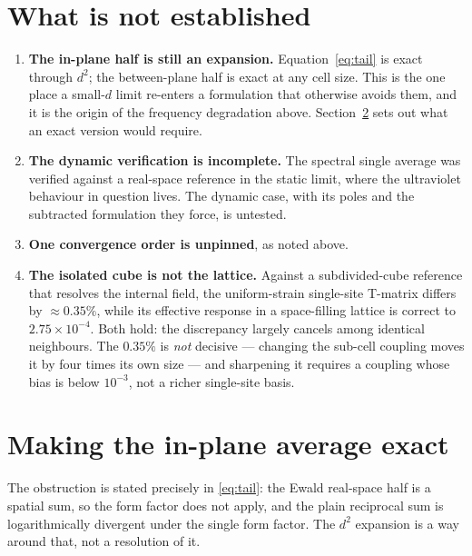 \documentclass[11pt,a4paper]{article}
\begin{document}
\section{What is not established}

\begin{enumerate}[leftmargin=2em]
\item \textbf{The in-plane half is still an expansion.} Equation~\eqref{eq:tail}
  is exact through $d^{2}$; the between-plane half is exact at any cell size.
  This is the one place a small-$d$ limit re-enters a formulation that otherwise
  avoids them, and it is the origin of the frequency degradation above.
  Section~\ref{sec:exact-inplane} sets out what an exact version would require.
\item \textbf{The dynamic verification is incomplete.} The spectral single
  average was verified against a real-space reference in the static limit, where
  the ultraviolet behaviour in question lives. The dynamic case, with its poles
  and the subtracted formulation they force, is untested.
\item \textbf{One convergence order is unpinned}, as noted above.
\item \textbf{The isolated cube is not the lattice.} Against a subdivided-cube
  reference that resolves the internal field, the uniform-strain single-site
  T-matrix differs by $\approx0.35\%$, while its effective response in a
  space-filling lattice is correct to $2.75\times10^{-4}$. Both hold: the
  discrepancy largely cancels among identical neighbours. The $0.35\%$ is
  \emph{not} decisive --- changing the sub-cell coupling moves it by four times
  its own size --- and sharpening it requires a coupling whose bias is below
  $10^{-3}$, not a richer single-site basis.
\end{enumerate}

\section{Making the in-plane average exact}
\label{sec:exact-inplane}

The obstruction is stated precisely in \eqref{eq:tail}: the Ewald real-space
half is a spatial sum, so the form factor does not apply, and the plain
reciprocal sum is logarithmically divergent under the single form factor. The
$d^{2}$ expansion is a way around that, not a resolution of it.
\end{document}
